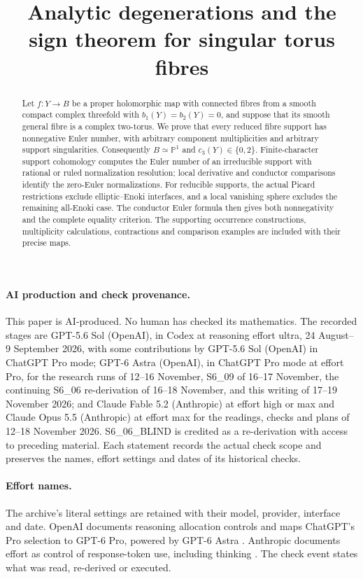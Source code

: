 

\title{Analytic degenerations and the sign theorem for singular torus fibres}\maketitle
\begin{abstract}
Let $f:Y\to B$ be a proper holomorphic map with connected fibres
from a smooth compact complex threefold with $b_1(Y)=b_2(Y)=0$,
and suppose that its smooth general fibre is a complex two-torus.
We prove that every reduced fibre support has nonnegative Euler
number, with arbitrary component multiplicities and arbitrary
support singularities. Consequently $B\simeq\mathbb P^1$ and
$c_3(Y)\in\{0,2\}$. Finite-character support cohomology computes
the Euler number of an irreducible support with rational or ruled
normalization resolution; local derivative and conductor
comparisons identify the zero-Euler normalizations. For reducible
supports, the actual Picard restrictions exclude elliptic--Enoki
interfaces, and a local vanishing sphere excludes the remaining
all-Enoki case. The conductor Euler formula then gives both
nonnegativity and the complete equality criterion. The supporting
occurrence constructions, multiplicity calculations, contractions
and comparison examples are included with their precise maps.
\end{abstract}
\paragraph{AI production and check provenance.}
This paper is AI-produced. No human has checked its mathematics.
The recorded stages are GPT-5.6 Sol (OpenAI), in Codex at reasoning
effort ultra, 24 August--9 September 2026, with some contributions by
GPT-5.6 Sol (OpenAI) in ChatGPT Pro mode; GPT-6 Astra (OpenAI), in
ChatGPT Pro mode at effort Pro, for the research runs of 12--16
November, S6\_09 of 16--17 November, the continuing S6\_06 re-derivation
of 16--18 November, and this writing of 17--19 November 2026;
and Claude Fable 5.2 (Anthropic)
at effort high or max and Claude Opus 5.5 (Anthropic) at effort max
for the readings, checks and plans of 12--18 November 2026.
S6\_06\_BLIND is credited as a re-derivation with access to preceding
material. Each statement records the actual check scope and preserves
the names, effort settings and dates of its historical checks.

\paragraph{Effort names.}
The archive's literal settings are retained with their model, provider,
interface and date. OpenAI documents reasoning allocation controls
\cite[sections ``Reasoning effort'' and ``Reasoning mode'']{OpenAIReasoning2026}
and maps ChatGPT's Pro selection to GPT-6 Pro, powered by GPT-6 Astra
\cite[section ``Choose a thinking level'']{OpenAIChatGPTPro2026}.
Anthropic documents effort as control of response-token use, including
thinking \cite[sections ``How effort works'' and ``Effort levels'']{AnthropicEffort2026}.
The check event states what was read, re-derived or executed.

